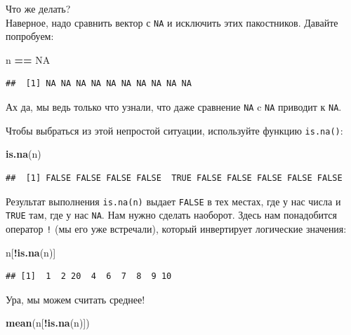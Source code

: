 \documentclass[]{book}
\newenvironment{Shaded}{\begin{snugshade}}{\end{snugshade}}
\newcommand{\KeywordTok}[1]{\textcolor[rgb]{0.13,0.29,0.53}{\textbf{#1}}}
\newcommand{\NormalTok}[1]{#1}
\newcommand{\OperatorTok}[1]{\textcolor[rgb]{0.81,0.36,0.00}{\textbf{#1}}}
\newcommand{\OtherTok}[1]{\textcolor[rgb]{0.56,0.35,0.01}{#1}}
\newcommand{\StringTok}[1]{\textcolor[rgb]{0.31,0.60,0.02}{#1}}
\begin{document}
Что же делать?\\
Наверное, надо сравнить вектор с \texttt{NA} и исключить этих пакостников. Давайте попробуем:

\begin{Shaded}
\begin{Highlighting}[]
\NormalTok{n }\OperatorTok{==}\StringTok{ }\OtherTok{NA}
\end{Highlighting}
\end{Shaded}

\begin{verbatim}
##  [1] NA NA NA NA NA NA NA NA NA NA
\end{verbatim}

Ах да, мы ведь только что узнали, что даже сравнение \texttt{NA} c \texttt{NA} приводит к \texttt{NA}.

Чтобы выбраться из этой непростой ситуации, используйте функцию \texttt{is.na()}:

\begin{Shaded}
\begin{Highlighting}[]
\KeywordTok{is.na}\NormalTok{(n)}
\end{Highlighting}
\end{Shaded}

\begin{verbatim}
##  [1] FALSE FALSE FALSE FALSE  TRUE FALSE FALSE FALSE FALSE FALSE
\end{verbatim}

Результат выполнения \texttt{is.na(n)} выдает \texttt{FALSE} в тех местах, где у нас числа и \texttt{TRUE} там, где у нас \texttt{NA}. Нам нужно сделать наоборот. Здесь нам понадобится оператор \texttt{!} (мы его уже встречали), который инвертирует логические значения:

\begin{Shaded}
\begin{Highlighting}[]
\NormalTok{n[}\OperatorTok{!}\KeywordTok{is.na}\NormalTok{(n)]}
\end{Highlighting}
\end{Shaded}

\begin{verbatim}
## [1]  1  2 20  4  6  7  8  9 10
\end{verbatim}

Ура, мы можем считать среднее!

\begin{Shaded}
\begin{Highlighting}[]
\KeywordTok{mean}\NormalTok{(n[}\OperatorTok{!}\KeywordTok{is.na}\NormalTok{(n)])}
\end{Highlighting}
\end{Shaded}
\end{document}

